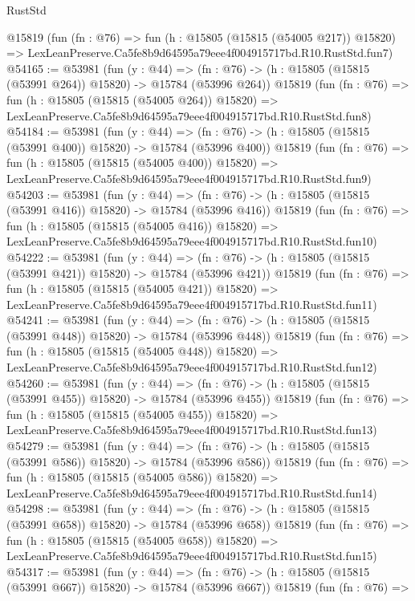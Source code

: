 \begin{lexlean}{RustStd}
\begin{coremodule}
    @15819
    (fun (fn : @76) =>
    fun (h : @15805 (@15815 (@54005 @217)) @15820) =>
    LexLeanPreserve.Ca5fe8b9d64595a79eee4f004915717bd.R10.RustStd.fun7)
@54165 := @53981
    (fun (y : @44) =>
    (fn : @76) -> (h : @15805 (@15815 (@53991 @264)) @15820) -> @15784 (@53996 @264))
    @15819
    (fun (fn : @76) =>
    fun (h : @15805 (@15815 (@54005 @264)) @15820) =>
    LexLeanPreserve.Ca5fe8b9d64595a79eee4f004915717bd.R10.RustStd.fun8)
@54184 := @53981
    (fun (y : @44) =>
    (fn : @76) -> (h : @15805 (@15815 (@53991 @400)) @15820) -> @15784 (@53996 @400))
    @15819
    (fun (fn : @76) =>
    fun (h : @15805 (@15815 (@54005 @400)) @15820) =>
    LexLeanPreserve.Ca5fe8b9d64595a79eee4f004915717bd.R10.RustStd.fun9)
@54203 := @53981
    (fun (y : @44) =>
    (fn : @76) -> (h : @15805 (@15815 (@53991 @416)) @15820) -> @15784 (@53996 @416))
    @15819
    (fun (fn : @76) =>
    fun (h : @15805 (@15815 (@54005 @416)) @15820) =>
    LexLeanPreserve.Ca5fe8b9d64595a79eee4f004915717bd.R10.RustStd.fun10)
@54222 := @53981
    (fun (y : @44) =>
    (fn : @76) -> (h : @15805 (@15815 (@53991 @421)) @15820) -> @15784 (@53996 @421))
    @15819
    (fun (fn : @76) =>
    fun (h : @15805 (@15815 (@54005 @421)) @15820) =>
    LexLeanPreserve.Ca5fe8b9d64595a79eee4f004915717bd.R10.RustStd.fun11)
@54241 := @53981
    (fun (y : @44) =>
    (fn : @76) -> (h : @15805 (@15815 (@53991 @448)) @15820) -> @15784 (@53996 @448))
    @15819
    (fun (fn : @76) =>
    fun (h : @15805 (@15815 (@54005 @448)) @15820) =>
    LexLeanPreserve.Ca5fe8b9d64595a79eee4f004915717bd.R10.RustStd.fun12)
@54260 := @53981
    (fun (y : @44) =>
    (fn : @76) -> (h : @15805 (@15815 (@53991 @455)) @15820) -> @15784 (@53996 @455))
    @15819
    (fun (fn : @76) =>
    fun (h : @15805 (@15815 (@54005 @455)) @15820) =>
    LexLeanPreserve.Ca5fe8b9d64595a79eee4f004915717bd.R10.RustStd.fun13)
@54279 := @53981
    (fun (y : @44) =>
    (fn : @76) -> (h : @15805 (@15815 (@53991 @586)) @15820) -> @15784 (@53996 @586))
    @15819
    (fun (fn : @76) =>
    fun (h : @15805 (@15815 (@54005 @586)) @15820) =>
    LexLeanPreserve.Ca5fe8b9d64595a79eee4f004915717bd.R10.RustStd.fun14)
@54298 := @53981
    (fun (y : @44) =>
    (fn : @76) -> (h : @15805 (@15815 (@53991 @658)) @15820) -> @15784 (@53996 @658))
    @15819
    (fun (fn : @76) =>
    fun (h : @15805 (@15815 (@54005 @658)) @15820) =>
    LexLeanPreserve.Ca5fe8b9d64595a79eee4f004915717bd.R10.RustStd.fun15)
@54317 := @53981
    (fun (y : @44) =>
    (fn : @76) -> (h : @15805 (@15815 (@53991 @667)) @15820) -> @15784 (@53996 @667))
    @15819
    (fun (fn : @76) =>

\end{coremodule}
\end{lexlean}
